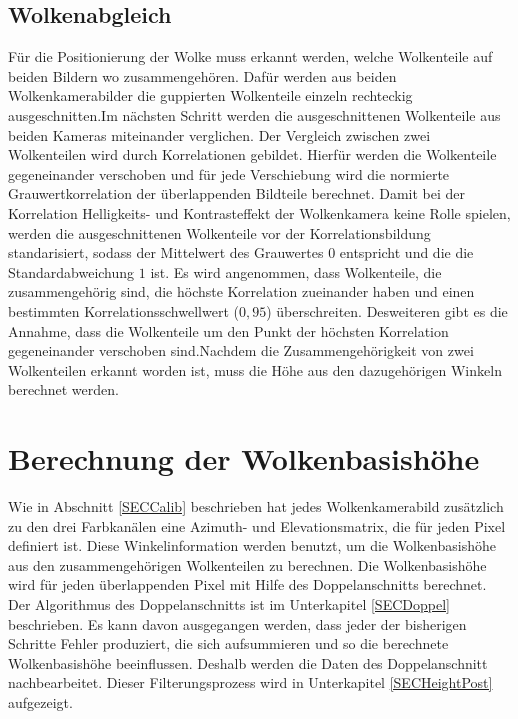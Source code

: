 \documentclass[a4paper,11pt,twoside,german]{article}
\newcommand{\absatz}{\smallbreak}
\begin{document}
\subsection{Wolkenabgleich}
Für die Positionierung der Wolke muss erkannt werden, welche Wolkenteile auf
beiden Bildern wo zusammengehören. Dafür werden aus beiden Wolkenkamerabilder
die guppierten Wolkenteile einzeln rechteckig ausgeschnitten.\absatz Im nächsten
Schritt werden die ausgeschnittenen Wolkenteile aus beiden Kameras miteinander
verglichen. Der Vergleich zwischen zwei Wolkenteilen wird durch Korrelationen
gebildet. Hierfür werden die Wolkenteile gegeneinander verschoben und für jede
Verschiebung wird die normierte Grauwertkorrelation der überlappenden Bildteile
berechnet. Damit bei der Korrelation Helligkeits- und Kontrasteffekt der
Wolkenkamera keine Rolle spielen, werden die ausgeschnittenen Wolkenteile vor
der Korrelationsbildung standarisiert, sodass der Mittelwert des Grauwertes $0$
entspricht und die die Standardabweichung $1$ ist. Es wird angenommen, dass
Wolkenteile, die zusammengehörig sind, die höchste Korrelation zueinander haben
und einen bestimmten Korrelationsschwellwert ($0,95$) überschreiten. Desweiteren
gibt es die Annahme, dass die Wolkenteile um den Punkt der höchsten Korrelation
gegeneinander verschoben sind.\absatz Nachdem die Zusammengehörigkeit von zwei
Wolkenteilen erkannt worden ist, muss die Höhe aus den dazugehörigen Winkeln
berechnet werden.


\section{Berechnung der Wolkenbasishöhe}
\label{SECHoehenbestimmung}
Wie in Abschnitt \ref{SECCalib} beschrieben hat jedes Wolkenkamerabild
zusätzlich zu den drei Farbkanälen eine Azimuth- und Elevationsmatrix, die für
jeden Pixel definiert ist. Diese Win\-kel\-in\-for\-ma\-tion werden benutzt, um
die Wolkenbasishöhe aus den zusammengehörigen Wolkenteilen zu berechnen. Die
Wolkenbasishöhe wird für jeden überlappenden Pixel mit Hilfe des
Doppelanschnitts berechnet. Der Algorithmus des Doppelanschnitts ist im
Unterkapitel \ref{SECDoppel} beschrieben. Es kann davon ausgegangen werden, dass
jeder der bisherigen Schritte Fehler produziert, die sich aufsummieren und so
die berechnete Wolkenbasishöhe beeinflussen. Deshalb werden die Daten des
Doppelanschnitt nachbearbeitet. Dieser Filterungsprozess wird in Unterkapitel
\ref{SECHeightPost} aufgezeigt.
\end{document}
